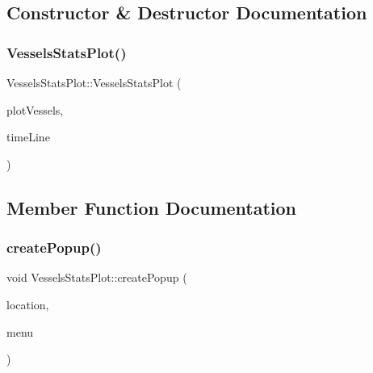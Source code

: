\subsection{Constructor \& Destructor Documentation}
\mbox{\label{class_vessels_stats_plot_ab6f1ed73ddc87f2558cf7ec70f9f4562}} 
\subsubsection{\texorpdfstring{VesselsStatsPlot()}{VesselsStatsPlot()}}
{\footnotesize\ttfamily Vessels\+Stats\+Plot\+::\+Vessels\+Stats\+Plot (\begin{DoxyParamCaption}\item[{\mbox{\hyperlink{class_q_custom_plot}{Q\+Custom\+Plot}} $\ast$}]{plot\+Vessels,  }\item[{\mbox{\hyperlink{class_q_c_p_item_line}{Q\+C\+P\+Item\+Line}} $\ast$}]{time\+Line }\end{DoxyParamCaption})}



\subsection{Member Function Documentation}
\mbox{\label{class_vessels_stats_plot_a0362431ae0205351ab2b1ee85520bac1}} 
\subsubsection{\texorpdfstring{createPopup()}{createPopup()}}
{\footnotesize\ttfamily void Vessels\+Stats\+Plot\+::create\+Popup (\begin{DoxyParamCaption}\item[{\mbox{\hyperlink{class_graph_interaction_controller_a67e6eba082927bf2b984bed54fe32764}{Graph\+Interaction\+Controller\+::\+Popup\+Menu\+Location}}}]{location,  }\item[{Q\+Menu $\ast$}]{menu }\end{DoxyParamCaption})}

\mbox{\label{class_vessels_stats_plot_a1886250b73f089bd1aca425d7323d743}} 
